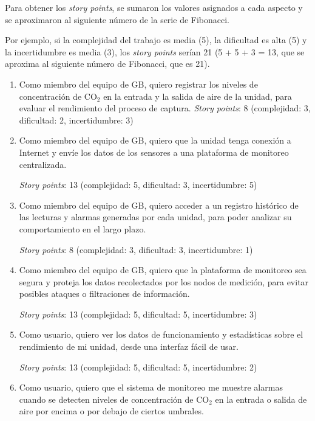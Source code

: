 \documentclass[
11pt, %
]{charter}
\begin{document}
Para obtener los \textit{story points}, se sumaron los valores asignados a cada aspecto y se aproximaron al siguiente número de la serie de Fibonacci.

Por ejemplo, si la complejidad del trabajo es media (5), la dificultad es alta (5) y la incertidumbre es media (3), los \textit{story points} serían 21 (5 + 5 + 3 = 13, que se aproxima al siguiente número de Fibonacci, que es 21).
\begin{enumerate}
\item Como miembro del equipo de GB, quiero registrar los niveles de concentración de CO$_2$ en la entrada y la salida de aire de la unidad, para evaluar el rendimiento del proceso de captura.
\textit{Story points}: 8 (complejidad: 3, dificultad: 2, incertidumbre: 3)

\item Como miembro del equipo de GB, quiero que la unidad tenga conexión a Internet y envíe los datos de los sensores a una plataforma de monitoreo centralizada.

\textit{Story points}: 13 (complejidad: 5, dificultad: 3, incertidumbre: 5)

\item Como miembro del equipo de GB, quiero acceder a un registro histórico de las lecturas y alarmas generadas por cada unidad, para poder analizar su comportamiento en el largo plazo. 

\textit{Story points}: 8 (complejidad: 3, dificultad: 3, incertidumbre: 1)

\item Como miembro del equipo de GB, quiero que la plataforma de monitoreo sea segura y proteja los datos recolectados por los nodos de medición, para evitar posibles ataques o filtraciones de información. 

\textit{Story points}: 13 (complejidad: 5, dificultad: 5, incertidumbre: 3)

\item Como usuario, quiero ver los datos de funcionamiento y estadísticas sobre el rendimiento de mi unidad, desde una interfaz fácil de usar. 

\textit{Story points}: 13 (complejidad: 5, dificultad: 5, incertidumbre: 2)

\item Como usuario, quiero que el sistema de monitoreo me muestre alarmas cuando se detecten niveles de concentración de CO$_2$ en la entrada o salida de aire por encima o por debajo de ciertos umbrales. 


\end{enumerate}
\end{document}
